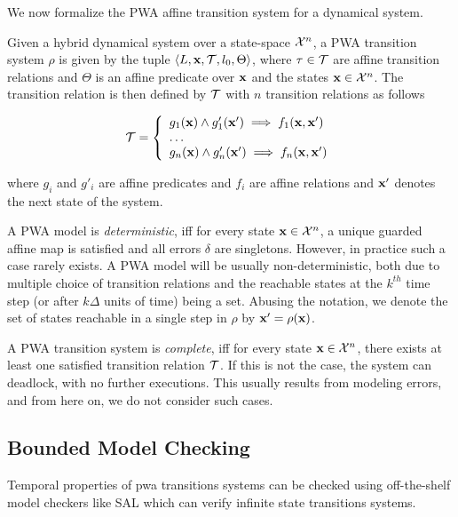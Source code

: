 We now formalize the PWA affine transition system for a dynamical system.
\begin{definition}

Given a hybrid dynamical system over a state-space
$\mathcal{X}^n$, a PWA transition system $\rho$ is given by the
tuple $\left\langle L,\mathbf{x},\mathcal{T},l_0,\Theta \right \rangle$, where $\tau \in
\mathcal{T}$ are affine transition relations and $\Theta$ is an affine
predicate over $\mathbf{x}$ and the states $\mathbf{x}\in\mathcal{X}^n$. The
transition relation is then defined by $\mathcal{T}$ with $n$ transition
relations as follows

\begin{equation}
    \mathcal{T} = \left\{
        \begin{array}{ll}
            g_1(\mathbf{x}) \land g'_1(\mathbf{x}') \implies f_1(\mathbf{x},\mathbf{x}') \\
            \ldots\\
            g_n(\mathbf{x}) \land g'_n(\mathbf{x}') \implies f_n(\mathbf{x},\mathbf{x}') \\
        \end{array}
    \right.
\end{equation}

\end{definition}

where $g_i$ and $g'_i$ are affine predicates and $f_i$ are affine
relations and $\mathbf{x}'$ denotes the next state of the system.

A PWA model is \textit{deterministic}, iff for every state
$\mathbf{x}\in\mathcal{X}^n$, a unique guarded affine map is satisfied and
all errors $\delta$ are singletons. However, in practice such a case
rarely exists. A PWA model will be usually non-deterministic, both due
to multiple choice of transition relations and the reachable states at
the $k^{th}$ time step (or after $k\Delta$ units of time) being a set.
Abusing the notation, we denote the set of states reachable in a
single step in $\rho$ by $\mathbf{x}' = \rho(\mathbf{x})$.

A PWA transition system is \textit{complete}, iff for every state
$\mathbf{x}\in\mathcal{X}^n$, there exists at least one satisfied
transition relation $\mathcal{T}$. If this is not the case, the system can
deadlock, with no further executions. This usually results from
modeling errors, and from here on, we do not consider such
cases.

\subsection{Bounded Model Checking}
Temporal properties of pwa transitions systems can be checked using
off-the-shelf model checkers like SAL which can verify infinite state
transitions systems.

